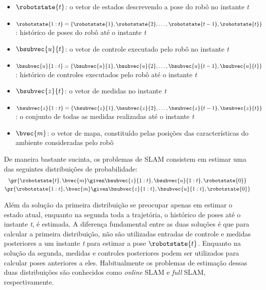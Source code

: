 \begin{itemize}
  \item $\robotstate{t}$: o vetor de estados descrevendo a pose do robô no instante \emph{t}
  \item $\robotstate{1:t} = \{ \robotstate{1}, \robotstate{2}, \dots, 
  \robotstate{t-1}, \robotstate{t} \}$: histórico de poses do robô até o instante \emph{t}
  \item $\bsubvec{u}{t}$: o vetor de controle executado pelo robô no instante \emph{t}
  \item $\bsubvec{u}{1:t} = \{ \bsubvec{u}{1}, \bsubvec{u}{2}, \dots, 
  \bsubvec{u}{t-1}, \bsubvec{u}{t} \}$: histórico de controles executados pelo robô até o instante \emph{t}
  \item $\bsubvec{z}{t}$: o vetor de medidas no instante \emph{t}
  \item $\bsubvec{z}{1:t} = \{ \bsubvec{z}{1}, \bsubvec{z}{2}, \dots, 
  \bsubvec{z}{t-1}, \bsubvec{z}{t} \}$: o conjunto de todas as medidas realizadas até o instante \emph{t}
  \item $\bvec{m}$: o vetor de mapa, constituído pelas posições das características do ambiente consideradas pelo robô
\end{itemize}

De maneira bastante sucinta, os problemas de SLAM consistem em estimar uma das 
seguintes distribuições de probabilidade:
\begin{gather}
  \pr{\robotstate{t}, \bvec{m} \given \bsubvec{z}{1:t} , \bsubvec{u}{1:t}, 
    \robotstate{0}}
  \label{eq:online-slam-probability} \\
  \pr{\robotstate{1:t}, \bvec{m} \given \bsubvec{z}{1:t} , \bsubvec{u}{1:t}, 
    \robotstate{0}}
  \label{eq:full-slam-probability}
\end{gather}

Além da solução da primeira distribuição se preocupar apenas em estimar o 
estado atual, enquanto na segunda toda a trajetória, o histórico de 
poses até o instante \emph{t}, é estimada. A diferença fundamental entre as 
duas soluções é que para calcular a primeira distribuição, não são utilizadas entradas de controle e medidas posteriores a um instante 
\emph{t} para estimar a pose $\robotstate{t}$. Enquanto na 
solução da segunda, medidas e controles posteriores podem ser utilizados para 
calcular poses anteriores a eles. Habitualmente os problemas de estimação 
dessas duas distribuições são conhecidos como \textit{online} SLAM e 
\textit{full} SLAM, respectivamente. 

